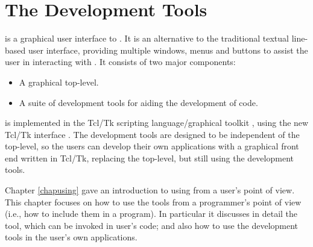 %
%
%
%
%
\chapter{The {\tkeclipse} Development Tools}
\label{chaptkeclipse}

{\tkeclipse} is a graphical user interface to {\eclipse}. It is an
alternative to the traditional textual line-based user interface, providing
multiple windows, menus and buttons to assist the user in interacting with
{\eclipse}. It consists of two major components:

\begin{itemize}
\item A graphical top-level.
\item A suite of development tools for aiding the development of {\eclipse}
code.
\end{itemize}

{\tkeclipse} is implemented in the Tcl/Tk scripting language/graphical toolkit
\cite{Tcl94}, using the new {\eclipse} Tcl/Tk interface
\cite{interfaceManual}. The development tools are designed to be
independent of the top-level, so the users can develop their own
applications with a graphical front end written in Tcl/Tk, replacing the
{\tkeclipse} top-level, but still using the development tools.

Chapter \ref{chapusing} gave an introduction to using {\tkeclipse} from a
user's point of view.
This chapter focuses on how to use the tools from a programmer's point of
view (i.e., how to include them in a program).
In particular it discusses in detail the  tool, which
can be invoked in user's {\eclipse} code; and also how to use the
development tools in the user's own applications.

